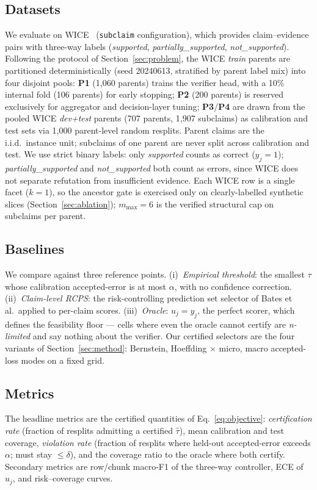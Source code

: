 \documentclass{article}
\begin{document}
\subsection{Datasets}
We evaluate on WICE~\cite{kamoi2023wice} (\texttt{subclaim} configuration),
which provides claim--evidence pairs with three-way labels
(\emph{supported}, \emph{partially\_supported}, \emph{not\_supported}).
Following the protocol of Section~\ref{sec:problem}, the WICE
\emph{train} parents are partitioned deterministically (seed 20240613,
stratified by parent label mix) into four disjoint pools:
\textbf{P1} (1{,}060 parents) trains the verifier head, with a 10\%
internal fold (106 parents) for early stopping; \textbf{P2} (200 parents)
is reserved exclusively for aggregator and decision-layer tuning;
\textbf{P3}/\textbf{P4} are drawn from the pooled WICE \emph{dev+test}
parents (707 parents, 1{,}907 subclaims) as calibration and test sets via
1{,}000 parent-level random resplits. Parent claims are the i.i.d.\
instance unit; subclaims of one parent are never split across
calibration and test. We use strict binary labels: only \emph{supported}
counts as correct ($y_j{=}1$); \emph{partially\_supported} and
\emph{not\_supported} both count as errors, since WICE does not separate
refutation from insufficient evidence. Each WICE row is a single facet
($k{=}1$), so the ancestor gate is exercised only on clearly-labelled
synthetic slices (Section~\ref{sec:ablation}); $m_{\max}{=}6$ is the
verified structural cap on subclaims per parent.

\subsection{Baselines}
We compare against three reference points. (i)~\emph{Empirical threshold}:
the smallest $\tau$ whose calibration accepted-error is at most $\alpha$,
with no confidence correction. (ii)~\emph{Claim-level RCPS}: the
risk-controlling prediction set selector of Bates et al.\ applied to
per-claim scores. (iii)~\emph{Oracle}: $u_j{=}y_j$, the perfect scorer,
which defines the feasibility floor --- cells where even the oracle
cannot certify are \emph{n-limited} and say nothing about the verifier.
Our certified selectors are the four variants of
Section~\ref{sec:method}: {Bernstein, Hoeffding} $\times$ {micro, macro}
accepted-loss modes on a fixed grid.

\subsection{Metrics}
The headline metrics are the certified quantities of
Eq.~\eqref{eq:objective}: \emph{certification rate} (fraction of resplits
admitting a certified $\hat\tau$), mean calibration and test coverage,
\emph{violation rate} (fraction of resplits where held-out accepted-error
exceeds $\alpha$; must stay $\le\delta$), and the coverage ratio to the
oracle where both certify. Secondary metrics are row/chunk macro-F1 of
the three-way controller, ECE of $u_j$, and risk--coverage curves.
\end{document}
